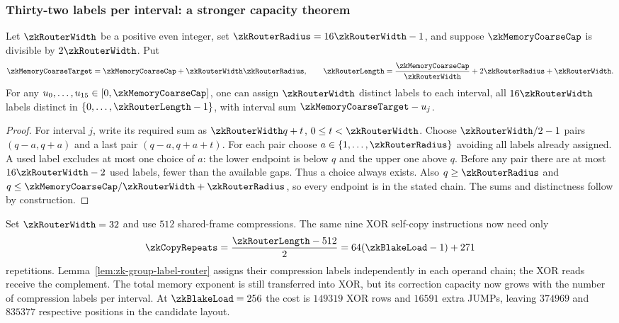 \subsubsection{Thirty-two labels per interval: a stronger capacity theorem}

\begin{lemma}\label{lem:zk-group-label-router}
Let $\zkRouterWidth$ be a positive even integer, set $\zkRouterRadius=16\zkRouterWidth-1$, and suppose $\zkMemoryCoarseCap$ is divisible by $2\zkRouterWidth$. Put
\[
 \zkMemoryCoarseTarget=\zkMemoryCoarseCap+\zkRouterWidth\zkRouterRadius,
 \qquad
 \zkRouterLength=\frac{\zkMemoryCoarseCap}{\zkRouterWidth}+2\zkRouterRadius+\zkRouterWidth.
\]
For any $u_0,\ldots,u_{15}\in[0,\zkMemoryCoarseCap]$, one can assign $\zkRouterWidth$ distinct labels to each interval, all $16\zkRouterWidth$ labels distinct in $\{0,\ldots,\zkRouterLength-1\}$, with interval sum $\zkMemoryCoarseTarget-u_j$.
\end{lemma}
\begin{proof}
For interval $j$, write its required sum as $\zkRouterWidth q+t$, $0\le t<\zkRouterWidth$. Choose $\zkRouterWidth/2-1$ pairs $(q-a,q+a)$ and a last pair $(q-a,q+a+t)$. For each pair choose $a\in\{1,\ldots,\zkRouterRadius\}$ avoiding all labels already assigned. A used label excludes at most one choice of $a$: the lower endpoint is below $q$ and the upper one above $q$. Before any pair there are at most $16\zkRouterWidth-2$ used labels, fewer than the available gaps. Thus a choice always exists. Also $q\ge\zkRouterRadius$ and $q\le\zkMemoryCoarseCap/\zkRouterWidth+\zkRouterRadius$, so every endpoint is in the stated chain. The sums and distinctness follow by construction.
\end{proof}

Set $\zkRouterWidth=32$ and use $512$ shared-frame compressions. The same nine XOR self-copy instructions now need only
\[
 \zkCopyRepeats=\frac{\zkRouterLength-512}{2}
 =64(\zkBlakeLoad-1)+271
\]
repetitions. Lemma~\ref{lem:zk-group-label-router} assigns their compression labels independently in each operand chain; the XOR reads receive the complement. The total memory exponent is still transferred into XOR, but its correction capacity now grows with the number of compression labels per interval. At $\zkBlakeLoad=256$ the cost is $149319$ XOR rows and $16591$ extra JUMPs, leaving $374969$ and $835377$ respective positions in the candidate layout.

